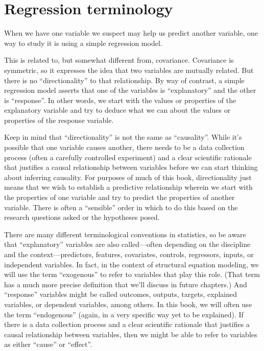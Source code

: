 \documentclass[
]{book}
\begin{document}
\hypertarget{simple-terminology}{%
\section{Regression terminology}\label{simple-terminology}}

When we have one variable we suspect may help us predict another variable, one way to study it is using a simple regression model.

This is related to, but somewhat different from, covariance. Covariance is symmetric, so it expresses the idea that two variables are mutually related. But there is no ``directionality'' to that relationship. By way of contrast, a simple regression model asserts that one of the variables is ``explanatory'' and the other is ``response''. In other words, we start with the values or properties of the explanatory variable and try to deduce what we can about the values or properties of the response variable.

Keep in mind that ``directionality'' is not the same as ``causality''. While it's possible that one variable causes another, there needs to be a data collection process (often a carefully controlled experiment) and a clear scientific rationale that justifies a causal relationship between variables before we can start thinking about inferring causality. For purposes of much of this book, directionality just means that we wish to establish a predictive relationship wherein we start with the properties of one variable and try to predict the properties of another variable. There is often a ``sensible'' order in which to do this based on the research questions asked or the hypotheses posed.

There are many different terminological conventions in statistics, so be aware that ``explanatory'' variables are also called---often depending on the discipline and the context---predictors, features, covariates, controls, regressors, inputs, or independent variables. In fact, in the context of structural equation modeling, we will use the term ``exogenous'' to refer to variables that play this role. (That term has a much more precise definition that we'll discuss in future chapters.) And ``response'' variables might be called outcomes, outputs, targets, explained variables, or dependent variables, among others. In this book, we will often use the term ``endogenous'' (again, in a very specific way yet to be explained). If there is a data collection process and a clear scientific rationale that justifies a causal relationship between variables, then we might be able to refer to variables as either ``cause'' or ``effect''.
\end{document}
